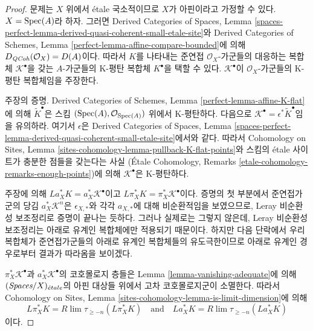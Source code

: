 \begin{proof}
문제는 $X$ 위에서 \'etale 국소적이므로 $X$가 아핀이라고 가정할 수
있다. $X = \mathop{\mathrm{Spec}}(A)$라 하자. 그러면 Derived Categories of Spaces,
Lemma \ref{spaces-perfect-lemma-derived-quasi-coherent-small-etale-site}와
Derived Categories of Schemes, Lemma
\ref{perfect-lemma-affine-compare-bounded}에 의해
$D_{\mathit{QCoh}}(\mathcal{O}_X) = D(A)$이다. 따라서 $K$를 나타내는 준연접
$\mathcal{O}_X$-가군들의 대응하는 복합체 $\mathcal{K}^\bullet$을 갖는
$A$-가군들의 K-평탄 복합체 $K^\bullet$을 택할 수 있다.
$\mathcal{K}^\bullet$이 $\mathcal{O}_X$-가군들의 K-평탄 복합체임을
주장한다.

\medskip\noindent
주장의 증명. Derived Categories of Schemes, Lemma
\ref{perfect-lemma-affine-K-flat}에 의해
$\widetilde{K}^\bullet$은 스킴
$(\mathop{\mathrm{Spec}}(A), \mathcal{O}_{\mathop{\mathrm{Spec}}(A)})$ 위에서 K-평탄하다.
다음으로 $\mathcal{K}^\bullet = \epsilon^*\widetilde{K}^\bullet$임을
유의하라. 여기서 $\epsilon$은 Derived Categories of Spaces, Lemma
\ref{spaces-perfect-lemma-derived-quasi-coherent-small-etale-site}에서와 같다.
따라서 Cohomology on Sites, Lemma
\ref{sites-cohomology-lemma-pullback-K-flat-points}와 스킴의 \'etale
사이트가 충분한 점들을 갖는다는 사실
(\'Etale Cohomology, Remarks
\ref{etale-cohomology-remarks-enough-points})에 의해
$\mathcal{K}^\bullet$은 K-평탄하다.

\medskip\noindent
주장에 의해
$La_X^*K = a_X^*\mathcal{K}^\bullet$이고
$L\pi_X^*K = \pi_X^*\mathcal{K}^\bullet$이다.
증명의 첫 부분에서 준연접가군의 당김
$a_X^*\mathcal{K}^n$은 $\epsilon_{X, *}$와 각각 $a_{X, *}$에 대해
비순환적임을 보였으므로, Leray 비순환성 보조정리로 증명이
끝나는 듯하다. 그러나 실제로는 그렇지 않은데, Leray 비순환성
보조정리는 아래로 유계인 복합체에만 적용되기 때문이다.
하지만 다음 단락에서 우리 복합체가 준연접가군들의 아래로 유계인
복합체들의 유도극한이므로 아래로 유계인 경우로부터 결과가
따라옴을 보이겠다.

\medskip\noindent
$\pi_X^*\mathcal{K}^\bullet$과 $a_X^*\mathcal{K}^\bullet$의
코호몰로지 층들은 Lemma \ref{lemma-vanishing-adequate}에 의해
$(\textit{Spaces}/X)_{\acute{e}tale}$의 아핀 대상들 위에서 고차 코호몰로지군이
소멸한다. 따라서 Cohomology on Sites, Lemma
\ref{sites-cohomology-lemma-is-limit-dimension}에 의해
$$
L\pi_X^*K = R\lim \tau_{\geq -n}(L\pi_X^*K)
\quad\text{and}\quad
La_X^*K = R\lim \tau_{\geq -n}(La_X^*K)
$$
이다.


\end{proof}
